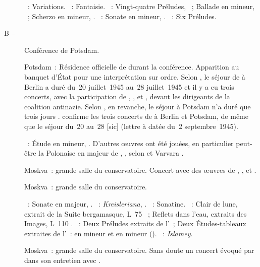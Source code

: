 \begin{description}
 \textsc{\Haendel{}}~: Variations.
 \textsc{\Mozart{}}~: Fantaisie.
 \textsc{\Chopin{}}~: Vingt-quatre Préludes, ~; Ballade 
 en \kF mineur, ~; Scherzo  en \kB \Flat mineur,
 .
 \textsc{\Scriabine{}}~: Sonate  en \kF \Sharp mineur, .
 \textsc{\Debussy{}}~: Six Préludes.
 \item[B\DateWithWeekDay{1945-07-17} -- \DateWithWeekDay{1945-08-02}]
 Conférence de Potsdam.
 \item[\DateWithWeekDay{1945-07-21}]
 Potsdam~: Résidence officielle de \Staline{} durant la conférence.
 Apparition au banquet d'\hbox{État} pour une interprétation sur ordre.
 Selon \citet[p.~423]{Scriabine}, le séjour de \VSofronitsky{} à Berlin a
 duré du~20 juillet~1945 au~28 juillet~1945 et il y a eu trois concerts,
 avec la participation de \VSofronitsky{}, \EGuilels{}, \GBarinova{} et
 \ADedioukhine{}, devant les dirigeants de la coalition antinazie.
 Selon \RKoganSofronitskaya{}, en revanche, le séjour à Potsdam n'a duré que
 trois jours \citep[p.~95]{Artese}.
 \citet[p.~166 et~167]{Nekrasova08} confirme les trois concerts de
 \Sofronitsky{} à Berlin et Potsdam, de même que le séjour du~20 au~28
  [sic] (lettre à \AVizel{} datée du~2 septembre~1945).

 \textsc{\Scriabine{}}~: Étude en \kD \Sharp mineur,  .
 D'autres œuvres ont été jouées, en particulier peut-être la Polonaise en
 \kA \Flat majeur de \Chopin{}, , selon \INikonovich{}
 \citep[voir][p.~54, note~7]{White} et Varvara \citet[p.~166]{Nekrasova08}.
 \item[\DateWithWeekDay{1945-09-20}]
 Moskva~: grande salle du conservatoire.
 Concert avec des œuvres de \Beethoven{}, \Schumann{}, \Ravel{} et
 \Debussy{}.
 \item[\DateWithWeekDay{1945-09-26}]
 Moskva~: grande salle du conservatoire.

 \textsc{\Beethoven{}}~: Sonate en \kE \Flat majeur, .
 \textsc{\Schumann{}}~: \emph{Kreisleriana}, .
 \textsc{\Ravel{}}~: Sonatine.
 \textsc{\Debussy{}}~: Clair de lune, extrait de la Suite bergamasque, L~75
 ~; Reflets dans l'eau, extraits des Images, L~110 .
 \textsc{\Rachmaninov{}}~: Deux Préludes extraits de l'~; Deux
 Études-tableaux extraites de l'~: en \kA mineur et en \kB mineur
 ().
 \textsc{\Balakirev{}}~: \emph{Islamey}.
 \item[\DateWithWeekDay{1945-10-04}]
 Moskva~: grande salle du conservatoire.
 Sans doute un concert évoqué par \VSofronitsky{} dans son entretien avec
 \citet{Vitsinsky}.


\end{description}
